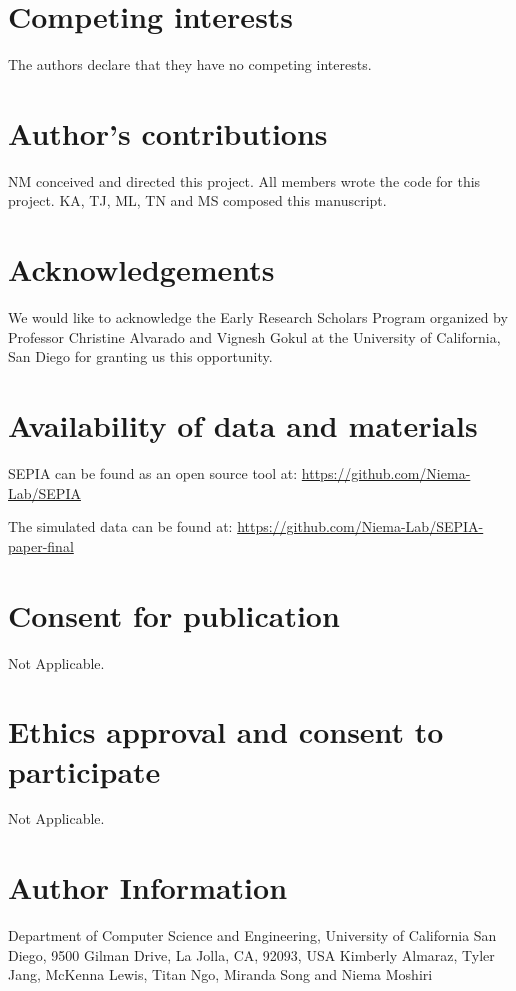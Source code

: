 \documentclass[twocolumn]{bmcart}%
\begin{document}
\begin{backmatter}

\section*{Competing interests}
  The authors declare that they have no competing interests.

\section*{Author's contributions}
    NM conceived and directed this project. All members wrote the code for this project. KA, TJ, ML, TN and MS composed this manuscript.
    
\section*{Acknowledgements}
 We would like to acknowledge the Early Research Scholars Program organized by Professor Christine Alvarado and Vignesh Gokul at the University of California, San Diego for granting us this opportunity.
  
\section*{Availability of data and materials}
SEPIA can be found as an open source tool at: \href{https://github.com/Niema-Lab/SEPIA}{https://github.com/Niema-Lab/SEPIA}

The simulated data can be found at: \href{https://github.com/Niema-Lab/SEPIA-paper-final}{https://github.com/Niema-Lab/SEPIA-paper-final}

\section*{Consent for publication}
    Not Applicable.
    
\section*{Ethics approval and consent to participate}
    Not Applicable.
    
\section*{Author Information}
    Department of Computer Science and Engineering, University of California San Diego, 9500 Gilman Drive, La Jolla, CA, 92093, USA
    \newline
    Kimberly Almaraz, Tyler Jang, McKenna Lewis, Titan Ngo, Miranda Song and Niema Moshiri
    

\end{backmatter}
\end{document}
